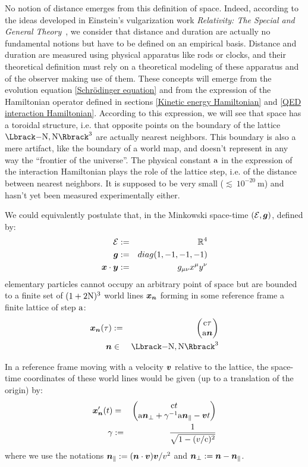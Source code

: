  No notion of distance emerges from this definition of space. Indeed, according to the ideas developed in Einstein's vulgarization work \textit{Relativity: The Special and General Theory}~\cite{Einstein1916}, we consider that distance and duration are actually no fundamental notions but have to be defined on an empirical basis. Distance and duration are measured using physical apparatus like rods or clocks, and their theoretical definition must rely on a theoretical modeling of these apparatus and of the observer making use of them. These concepts will emerge from the evolution equation \ref{Schrödinger equation} and from the expression of the Hamiltonian operator defined in sections \ref{Kinetic energy Hamiltonian} and \ref{QED interaction Hamiltonian}. According to this expression, we will see that space has a toroidal structure, i.e. that opposite points on the boundary of the lattice $\FL$ are actually nearest neighbors. This boundary is also a mere artifact, like the boundary of a world map, and doesn't represent in any way the ``frontier of the universe''. The physical constant $\mathrm a$ in the expression of the interaction Hamiltonian plays the role of the lattice step, i.e. of the distance between nearest neighbors. It is supposed to be very small ($\lesssim~10^{-20}~\mathrm m$) and hasn't yet been measured experimentally either.

 We could equivalently postulate that, in the Minkowski space-time $(\mathcal E,\boldsymbol{g})$, defined by:
\begin{eqnarray*}
\mathcal E & := & \mathbb{R}^4 \\
\boldsymbol{g} & := & diag(1,-1,-1,-1) \\
\boldsymbol{x} \cdot \boldsymbol{y} & := & {g}_{\mu\nu} {x}^{\mu} {y}^{\nu}
\end{eqnarray*}
elementary particles cannot occupy an arbitrary point of space but are bounded to a finite set of $(1+2 \mathrm N)^3$ world lines $\boldsymbol{x}_{\boldsymbol{n}}$ forming in some reference frame a finite lattice of step $\mathrm a$:
\begin{eqnarray*}
\wlt \n \tau & \eqdef & \matrix{\c \tau \\ \a \n} \\
\n & \in & \FL
\end{eqnarray*}

In a reference frame moving with a velocity $\boldsymbol{v}$ relative to the lattice, the space-time coordinates of these world lines would be given (up to a translation of the origin) by:
\begin{eqnarray*}
{\boldsymbol{x}}'_{\boldsymbol{n}}({t}) & = & \begin{pmatrix} \mathrm c t \\ \mathrm a  \boldsymbol{n}_\perp + \gamma^{-1} \mathrm a  \boldsymbol{n}_\parallel - \boldsymbol{v} t \end{pmatrix} \\
\gamma & := & \frac 1 {\sqrt{1 - (v / \mathrm c)^2}}
\end{eqnarray*}
where we use the notations $\boldsymbol{n}_\parallel := ( \boldsymbol{n} \cdot \boldsymbol{v} ) \boldsymbol{v} / v^2$ and $\boldsymbol{n}_\perp := \boldsymbol{n} - \boldsymbol{n}_\parallel$.

